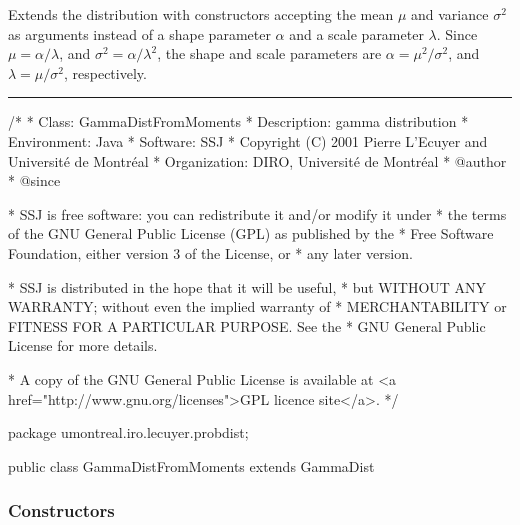 
Extends the  distribution with constructors accepting the
mean $\mu$ and variance $\sigma^2$ as arguments instead of a shape parameter
$\alpha$ and a scale parameter $\lambda$.
Since $\mu=\alpha / \lambda$, and $\sigma^2=\alpha / \lambda^2$,
the shape and scale parameters are $\alpha=\mu^2 / \sigma^2$, and
$\lambda=\mu / \sigma^2$, respectively.

\bigskip\hrule

\begin{code}
\begin{hide}
/*
 * Class:        GammaDistFromMoments
 * Description:  gamma distribution
 * Environment:  Java
 * Software:     SSJ 
 * Copyright (C) 2001  Pierre L'Ecuyer and Université de Montréal
 * Organization: DIRO, Université de Montréal
 * @author       
 * @since

 * SSJ is free software: you can redistribute it and/or modify it under
 * the terms of the GNU General Public License (GPL) as published by the
 * Free Software Foundation, either version 3 of the License, or
 * any later version.

 * SSJ is distributed in the hope that it will be useful,
 * but WITHOUT ANY WARRANTY; without even the implied warranty of
 * MERCHANTABILITY or FITNESS FOR A PARTICULAR PURPOSE.  See the
 * GNU General Public License for more details.

 * A copy of the GNU General Public License is available at
   <a href="http://www.gnu.org/licenses">GPL licence site</a>.
 */
\end{hide}
package umontreal.iro.lecuyer.probdist;


public class GammaDistFromMoments extends GammaDist\begin{hide} {
\end{hide}
\end{code}
\subsubsection*{Constructors}

